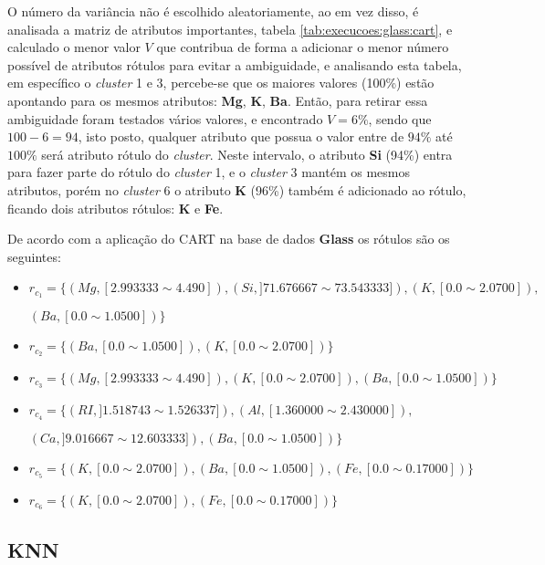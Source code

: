 O número da variância não é escolhido aleatoriamente, ao em vez disso, é analisada a matriz de atributos importantes, tabela  \ref{tab:execucoes:glass:cart}, e calculado o menor valor ${V}$ que contribua de forma a adicionar o menor número possível de atributos rótulos para  evitar a ambiguidade, e analisando esta tabela, em específico o \textit{cluster} 1 e 3, percebe-se que os maiores valores (100\%) estão apontando para os mesmos atributos: \textbf{Mg}, \textbf{K}, \textbf{Ba}. Então, para retirar essa ambiguidade foram testados vários valores, e encontrado ${V=6\%}$, sendo que ${100-6=94}$, isto posto, qualquer atributo que possua o valor entre de ${94\%}$ até ${100\%}$ será atributo rótulo do \textit{cluster}. Neste intervalo, o atributo \textbf{Si} (94\%) entra para  fazer parte do rótulo do \textit{cluster} 1, e o \textit{cluster} 3 mantém os mesmos atributos, porém no \textit{cluster} 6 o atributo \textbf{K} (96\%) também é adicionado ao rótulo, ficando dois atributos rótulos: \textbf{K} e \textbf{Fe}.


De acordo com a aplicação do CART na base de dados \textbf{Glass} os rótulos são os seguintes:
\begin{itemize}[noitemsep]
 \item ${r_{c_1}=\{ (Mg, [ 2.993333 \sim  4.490]), (Si,] 71.676667 \sim 73.543333 ]), (K,[ 0.0 \sim  2.0700 ] ), }$

 ${ (Ba,[ 0.0 \sim 1.0500 ] ) \} }$  
 \item ${r_{c_2}=\{(Ba,[ 0.0 \sim 1.0500 ] ), (K,[ 0.0 \sim  2.0700 ] ) \} }$
 \item ${r_{c_3}=\{ (Mg, [ 2.993333 \sim  4.490]), (K,[ 0.0 \sim  2.0700 ] ), (Ba,[ 0.0 \sim 1.0500 ] )  \} }$  
 \item ${r_{c_4}=\{ (RI,] 1.518743 \sim  1.526337 ] ), (Al,[ 1.360000 \sim  2.430000 ] ), }$
 
 ${(Ca,] 9.016667 \sim  12.603333] ), (Ba,[ 0.0 \sim 1.0500 ] ) \}}$

 \item ${r_{c_5}=\{ (K,[ 0.0 \sim  2.0700 ] ), (Ba,[ 0.0 \sim 1.0500 ] ), (Fe,[ 0.0 \sim 0.17000] ) \} }$
 \item ${r_{c_6}=\{ (K,[ 0.0 \sim  2.0700 ] ),(Fe,[ 0.0 \sim 0.17000] ) \} }$
\end{itemize}



\subsection{KNN} \label{cap:resultados:ssec:glass:knn}


